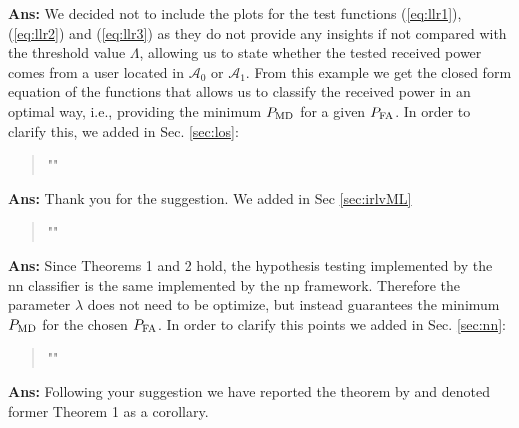 \documentclass[draftcls,onecolumn,12pt]{IEEEtran}
\newcounter{revc}
\newcommand{\revp}[1]{\zref[revcontent]{#1}}
\begin{document}
{
{\bf Ans:} We decided not to include the plots for the test functions (\ref{eq:llr1}), (\ref{eq:llr2}) and (\ref{eq:llr3}) as they do not provide any insights if not compared with the threshold value $\Lambda$, allowing us to state whether the tested received power comes from a user located in $\mathcal{A}_0$ or $\mathcal{A}_1$. From this example we get the closed form equation of the functions that allows us to classify the received power in an optimal way, i.e., providing the minimum $P_{\rm MD}$ for a given $P_{\rm FA}$. In order to clarify this, we added in Sec. \ref{sec:los}:
\begin{quote}
"\revp{llrComp}"
\end{quote}

\vspace{5mm} %
\begin{framed}
\end{framed}

{\bf Ans:} Thank you for the suggestion. We added in Sec \ref{sec:irlvML}
\begin{quote}
"\revp{supervised}"
\end{quote}

\vspace{5mm} %
\begin{framed}
\end{framed}

{\bf Ans:} Since Theorems 1 and 2 hold, the hypothesis testing implemented by the \ac{nn} classifier is the same implemented by the \ac{np} framework. Therefore the parameter $\lambda$ does not need to be optimize, but instead guarantees the minimum $P_{\rm MD}$ for the chosen $P_{\rm FA}$. In order to clarify this points we added in Sec. \ref{sec:nn}:
\begin{quote}
"\revp{lambdaNN}"
\end{quote}

\vspace{5mm} %
\begin{framed}
\end{framed}

{\bf Ans:} Following your suggestion we have reported the theorem by \cite{Ruck-90} and denoted former Theorem 1 as a corollary.


}
\end{document}
